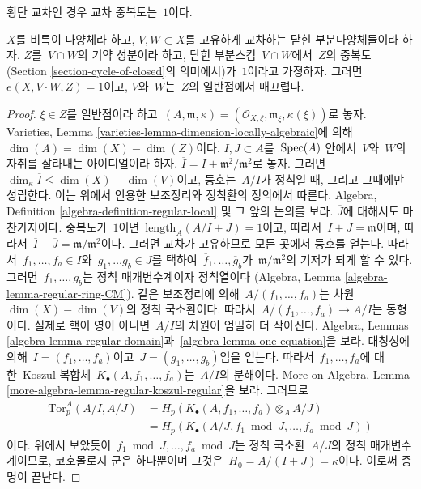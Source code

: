 \medskip\noindent
횡단 교차인 경우 교차 중복도는\  $1$이다.

\begin{lemma}
\label{lemma-transversal}
$X$를 비특이 다양체라 하고, $V, W \subset X$를 고유하게 교차하는 닫힌
부분다양체들이라 하자. $Z$를\  $V \cap W$의 기약 성분이라 하고, 닫힌
부분스킴\  $V \cap W$에서\  $Z$의 중복도
(Section \ref{section-cycle-of-closed}의 의미에서)가\  $1$이라고 가정하자.
그러면\  $e(X, V \cdot W, Z) = 1$이고, $V$와\  $W$는\  $Z$의 일반점에서
매끄럽다.
\end{lemma}

\begin{proof}
$\xi \in Z$를 일반점이라 하고\ 
$(A, \mathfrak m, \kappa) =
(\mathcal{O}_{X, \xi}, \mathfrak m_\xi, \kappa(\xi))$로 놓자.
Varieties, Lemma
\ref{varieties-lemma-dimension-locally-algebraic}에 의해\ 
$\dim(A) = \dim(X) - \dim(Z)$이다.
$I, J \subset A$를\  $\mathop{\mathrm{Spec}}(A)$ 안에서\  $V$와\  $W$의 자취를 잘라내는
아이디얼이라 하자.
$\overline{I} = I + \mathfrak m^2/\mathfrak m^2$로 놓자.
그러면\  $\dim_\kappa \overline{I} \leq \dim(X) - \dim(V)$이고,
등호는\  $A/I$가 정칙일 때, 그리고 그때에만 성립한다.
이는 위에서 인용한 보조정리와 정칙환의 정의에서 따른다.
Algebra, Definition \ref{algebra-definition-regular-local} 및 그 앞의
논의를 보라. $\overline{J}$에 대해서도 마찬가지이다.
중복도가\  $1$이면\ 
$\text{length}_A(A/I + J) = 1$이고, 따라서\  $I + J = \mathfrak m$이며,
따라서\  $\overline{I} + \overline{J} = \mathfrak m/\mathfrak m^2$이다.
그러면 교차가 고유하므로 모든 곳에서 등호를 얻는다. 따라서\ 
$f_1, \ldots, f_a \in I$와\  $g_1, \ldots g_b \in J$를 택하여\ 
$\overline{f}_1, \ldots, \overline{g}_b$가\ 
$\mathfrak m/\mathfrak m^2$의 기저가 되게 할 수 있다.
그러면\  $f_1, \ldots, g_b$는 정칙 매개변수계이자 정칙열이다
(Algebra, Lemma \ref{algebra-lemma-regular-ring-CM}).
같은 보조정리에 의해\  $A/(f_1, \ldots, f_a)$는 차원\ 
$\dim(X) - \dim(V)$의 정칙 국소환이다. 따라서\ 
$A/(f_1, \ldots, f_a) \to A/I$는 동형이다. 실제로 핵이 영이 아니면\ 
$A/I$의 차원이 엄밀히 더 작아진다. Algebra, Lemmas
\ref{algebra-lemma-regular-domain}과\ 
\ref{algebra-lemma-one-equation}을 보라.
대칭성에 의해\  $I = (f_1, \ldots, f_a)$이고\ 
$J = (g_1, \ldots, g_b)$임을 얻는다.
따라서\  $f_1, \ldots, f_a$에 대한\  Koszul 복합체\ 
$K_\bullet(A, f_1, \ldots, f_a)$는\  $A/I$의 분해이다.
More on Algebra, Lemma
\ref{more-algebra-lemma-regular-koszul-regular}을 보라. 그러므로
\begin{align*}
\text{Tor}_p^A(A/I, A/J)
& =
H_p(K_\bullet(A, f_1, \ldots, f_a) \otimes_A A/J) \\
& =
H_p(K_\bullet(A/J, f_1 \bmod J, \ldots, f_a \bmod J))
\end{align*}
이다. 위에서 보았듯이\ 
$f_1 \bmod J, \ldots, f_a \bmod J$는 정칙 국소환\  $A/J$의 정칙
매개변수계이므로, 코호몰로지 군은 하나뿐이며 그것은\ 
$H_0 = A/(I + J) = \kappa$이다. 이로써 증명이 끝난다.
\end{proof}

